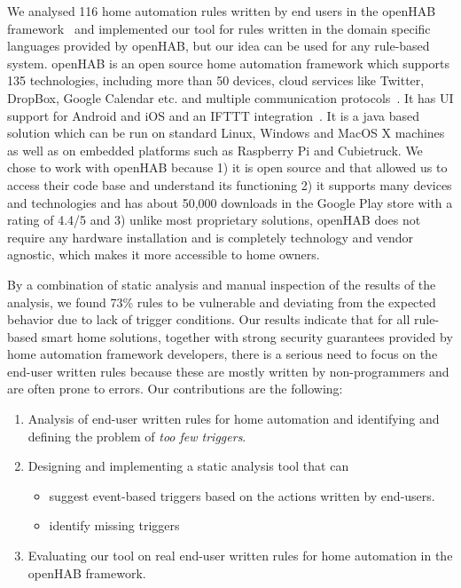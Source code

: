 \documentclass{sig-alternate-05-2015}
\begin{document}
We analysed 116 home automation rules written by end users in the openHAB framework~\cite{openhab} and implemented our tool for rules written in the domain specific languages provided by openHAB, but our idea can be used for any rule-based system.
openHAB is an open source home automation framework which supports 135 technologies, including more than 50 devices, cloud services like Twitter, DropBox, Google Calendar etc. and multiple communication protocols~\cite{openhabtech}. It has UI support for Android and iOS and an IFTTT integration~\cite{ifttt}. It is a java based solution which can be run on standard Linux, Windows and MacOS X machines as well as on embedded platforms such as Raspberry Pi and Cubietruck. We chose to work with openHAB because
1) it is open source and that allowed us to access their code base and understand its functioning 2) it supports many devices and technologies and has about 50,000 downloads in the Google Play store with a rating of 4.4/5 and 3) unlike most proprietary solutions, openHAB does not require any hardware installation and is completely technology and vendor agnostic, which makes it more accessible to home owners. 

By a combination of static analysis and manual inspection of the results of the analysis, we found 73\% rules to be vulnerable and deviating from the expected behavior due to lack of trigger conditions. Our results indicate that for all rule-based smart home solutions, together with strong security guarantees provided by home automation framework developers, there is a serious need to focus on the end-user written rules because these are mostly written by non-programmers and are often prone to errors. 
Our contributions are the following:
\begin{enumerate}[topsep=0pt,itemsep=-1ex]
\item Analysis of end-user written rules for home automation and identifying and defining the problem of \textit{too few triggers}.
\item  Designing and implementing a static analysis tool that can 
\begin{itemize}[topsep=-10pt,itemsep=-1ex,partopsep=1ex,parsep=1ex]
\item suggest event-based triggers based on the actions written by end-users.
\item identify missing triggers 
\end{itemize}
\item Evaluating our tool on real end-user written rules for home automation in the openHAB framework.
\end{enumerate}
\end{document}
